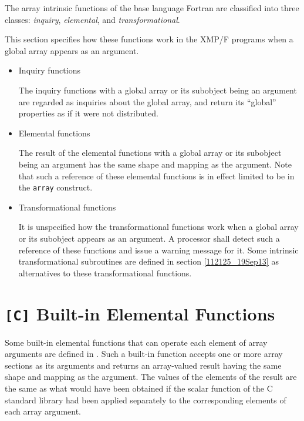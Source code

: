 The array intrinsic functions of the base language Fortran are
classified into three classes: {\it inquiry}, {\it elemental}, and
{\it transformational}.

This section specifies how these functions work in the XMP/F
programs when a global array appears as an argument.

\begin{itemize}
 \item Inquiry functions

       The inquiry functions with a global array or its subobject
       being an argument are regarded as inquiries about the global
       array, and return its ``global'' properties as if it were not
       distributed.

 \item Elemental functions

       The result of the elemental functions with a global array or
       its subobject being an argument has the same shape and
       mapping as the argument.
%
       Note that such a reference of these elemental functions is in
       effect limited to be in the {\tt array} construct.

 \item Transformational functions

       It is unspecified how the transformational functions work when a
       global array or its subobject appears as an argument.
%
       A processor shall detect such a reference of these functions
       and issue a warning message for it.
%
       Some intrinsic transformational subroutines are defined in
       section \ref{112125_19Sep13} as alternatives to these
       transformational functions.

\end{itemize}


\section{{\tt [C]} Built-in Elemental Functions}
\label{094142_25Sep13}

Some built-in elemental functions that can operate each element of
array arguments are defined in {\XMPC}. Such a built-in function
accepts one or more array sections as its arguments and returns an
array-valued result having the same shape and mapping as the argument.
%
The values of the elements of the result are the same as what would have
been obtained if the scalar function of the C standard library had
been applied separately to the corresponding elements of each array
argument.

